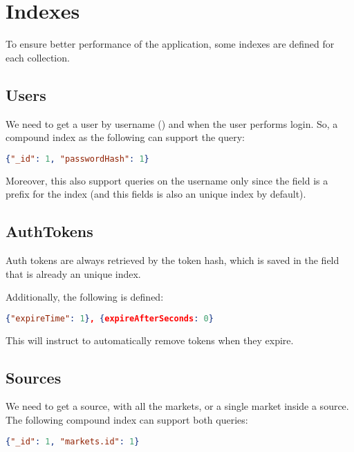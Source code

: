 \section{Indexes}\label{sec:indexes}

To ensure better performance of the application, some indexes are defined for
each collection.

\subsection{Users}

We need to get a user by username () and 
when the user performs login. So, a compound index as the following can support
the query:

\begin{lstlisting}[language=json]
{"_id": 1, "passwordHash": 1}
\end{lstlisting}

Moreover, this also support queries on the username only since the 
field is a prefix for the index (and this fields is also an unique index by
default).

\subsection{AuthTokens}

Auth tokens are always retrieved by the token hash, which is saved in the
 field that is already an unique index.

Additionally, the following  is defined:

\begin{lstlisting}[language=json]
{"expireTime": 1}, {expireAfterSeconds: 0}
\end{lstlisting}

This will instruct \mongodb{} to automatically remove tokens when they expire.

\subsection{Sources}

We need to get a source, with all the markets, or a single market inside a
source. The following compound index can support both queries:

\begin{lstlisting}[language=json]
{"_id": 1, "markets.id": 1}
\end{lstlisting}

